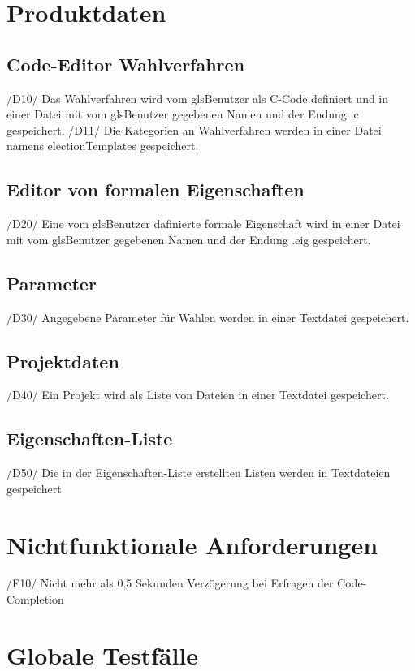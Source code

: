 \documentclass[a4paper]{scrreprt}
\begin{document}
\chapter{Produktdaten}
\section{Code-Editor Wahlverfahren}
/D10/ Das Wahlverfahren wird vom gls{Benutzer} als C-Code definiert und in einer Datei mit vom gls{Benutzer} gegebenen Namen und der Endung .c gespeichert.
/D11/ Die Kategorien an Wahlverfahren werden in einer Datei namens electionTemplates gespeichert.

\section{Editor von formalen Eigenschaften}
/D20/ Eine vom gls{Benutzer} dafinierte formale Eigenschaft wird in einer Datei mit vom gls{Benutzer} gegebenen Namen und der Endung .eig gespeichert.

\section{Parameter}
/D30/ Angegebene Parameter für Wahlen werden in einer Textdatei gespeichert.


\section{Projektdaten}
/D40/ Ein Projekt wird als Liste von Dateien in einer Textdatei gespeichert.

\section{Eigenschaften-Liste}
/D50/ Die in der Eigenschaften-Liste erstellten Listen werden in Textdateien gespeichert

\chapter{Nichtfunktionale Anforderungen}
/F10/ Nicht mehr als 0,5 Sekunden Verzögerung bei Erfragen der Code-Completion


\chapter{Globale Testfälle}
\end{document}
